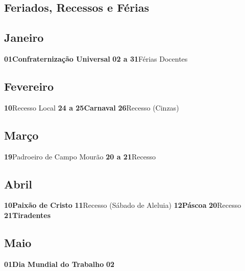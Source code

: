 \documentclass[thesis]{hmcposter}
\begin{document}
\begin{poster}
\newpage\onespacing \small \section{\color{hmcorange}Feriados, Recessos e Férias}\subsection{Janeiro}\textbf{01}\quad \quad \quad \quad \textbf{Confraternização Universal} \newline\textbf{02 a 31}\quad \quad Férias Docentes \newline\subsection{Fevereiro}\textbf{10}\quad \quad \quad \quad Recesso Local \newline\textbf{24 a 25}\quad \quad \textbf{Carnaval} \newline\textbf{26}\quad \quad \quad \quad Recesso (Cinzas) \newline\subsection{Março}\textbf{19}\quad \quad \quad \quad Padroeiro de Campo Mourão \newline\textbf{20 a 21}\quad \quad Recesso \newline\subsection{Abril}\textbf{10}\quad \quad \quad \quad \textbf{Paixão de Cristo} \newline\textbf{11}\quad \quad \quad \quad Recesso (Sábado de Aleluia) \newline\textbf{12}\quad \quad \quad \quad \textbf{Páscoa} \newline\textbf{20}\quad \quad \quad \quad Recesso \newline\textbf{21}\quad \quad \quad \quad \textbf{Tiradentes} \newline\subsection{Maio}\textbf{01}\quad \quad \quad \quad \textbf{Dia Mundial do Trabalho} \newline\textbf{02}\quad 
\end{poster}
\end{document}
